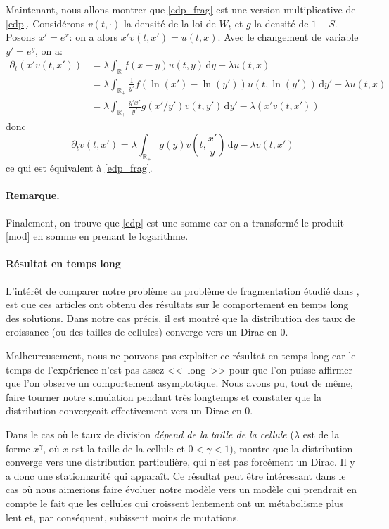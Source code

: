 \documentclass[12pt]{article}
\newcounter{thm}
\newcommand{\req}[1]{\paragraph{Remarque.}#1\vspace{0.1cm}}
\newcommand{\pth}[1]{\left(#1\right)}
\newcommand{\Er}{\mathbb{R}}
\newcommand{\de}{\,\mathrm{d}}
\newcommand{\dr}{\partial}
\begin{document}
Maintenant, nous allons montrer que \eqref{edp_frag} est une version multiplicative de \eqref{edp}.  Considérons $v(t,\cdot)$ la densité de la loi de $W_t$ et $g$ la densité de $1-S$. Posons $x'=e^x$: on a alors $x'v(t,x')=u(t,x)$. Avec le changement de variable $y'=e^y$, on a:
\begin{align*}
  \dr_t(x'v(t,x'))
  &=\lambda\int_{\Er}f(x-y)u(t,y)\de y-\lambda u(t,x)\\
  &=\lambda\int_{\Er_+}\frac{1}{y'}f(\ln(x')-\ln(y'))u(t,\ln(y'))\de y'-\lambda u(t,x)\\
  &=\lambda\int_{\Er_+}\frac{y'x'}{y'}g(x'/y')v\pth{t,y'}\de y'-\lambda\pth{x'v(t,x')}
\end{align*}
donc 
\[\dr_tv(t,x')=\lambda\int_{\Er_+}g(y)v\pth{t,\frac{x'}{y}}\de y-\lambda v(t,x')\]
ce qui est équivalent à \eqref{edp_frag}.

\req{Finalement, on trouve que \eqref{edp} est une somme car on a transformé le produit \eqref{mod} en somme en prenant le logarithme.}


\paragraph{Résultat en temps long} L'intérêt de comparer notre problème au problème de fragmentation étudié dans \cite{md1}, \cite{md2} est que ces articles ont obtenu des résultats sur le comportement en temps long des solutions. Dans notre cas précis, il est montré que la distribution des taux de croissance (ou des tailles de cellules) converge vers un Dirac en 0. 

Malheureusement, nous ne pouvons pas exploiter ce résultat en temps long car le temps de l'expérience n'est pas assez <<~long~>> pour que l'on puisse affirmer que l'on observe un comportement asymptotique. Nous avons pu, tout de même, faire tourner notre simulation pendant très longtemps et constater que la distribution convergeait effectivement vers un Dirac en 0.

Dans le cas où le taux de division \emph{dépend de la taille de la cellule} ($\lambda$ est de la forme $x^{\gamma}$, où $x$ est la taille de la cellule et $0<\gamma<1$), \cite{md2} montre que la distribution converge vers une distribution particulière, qui n'est pas forcément un Dirac. Il y a donc une stationnarité qui apparaît. Ce résultat peut être intéressant dans le cas où nous aimerions faire évoluer notre modèle vers un modèle qui prendrait en compte le fait que les cellules qui croissent lentement ont un métabolisme plus lent et, par conséquent, subissent moins de mutations.
\end{document}
